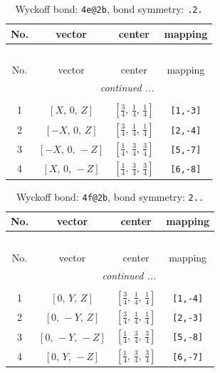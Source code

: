 \documentclass[fleqn,8pt]{jsarticle}
\begin{document}
\renewcommand{\arraystretch}{1.2}
\begin{longtable}{cccc}
\caption{Wyckoff bond: {\tt 4e@2b}, bond symmetry: {\tt .2.}}
 \\
 \hline \hline
No. & vector & center & mapping \\ \hline \endfirsthead

\multicolumn{3}{l}{\tablename\ \thetable{}} \\
 \hline \hline
No. & vector & center & mapping \\ \hline \endhead

 \hline \hline
\multicolumn{3}{r}{\footnotesize\it continued ...} \\ \endfoot

 \hline \hline
\multicolumn{3}{r}{} \\ \endlastfoot

1 & $\left[ X,\, 0,\, Z \right]$ & $\left[ \frac{3}{4},\, \frac{1}{4},\, \frac{1}{4} \right]$ & {\tt [1,-3]} \\ \hline
2 & $\left[ - X,\, 0,\, Z \right]$ & $\left[ \frac{3}{4},\, \frac{1}{4},\, \frac{1}{4} \right]$ & {\tt [2,-4]} \\ \hline
3 & $\left[ - X,\, 0,\, - Z \right]$ & $\left[ \frac{1}{4},\, \frac{3}{4},\, \frac{3}{4} \right]$ & {\tt [5,-7]} \\ \hline
4 & $\left[ X,\, 0,\, - Z \right]$ & $\left[ \frac{1}{4},\, \frac{3}{4},\, \frac{3}{4} \right]$ & {\tt [6,-8]} \\
\end{longtable}
\renewcommand{\arraystretch}{1.2}
\begin{longtable}{cccc}
\caption{Wyckoff bond: {\tt 4f@2b}, bond symmetry: {\tt 2..}}
 \\
 \hline \hline
No. & vector & center & mapping \\ \hline \endfirsthead

\multicolumn{3}{l}{\tablename\ \thetable{}} \\
 \hline \hline
No. & vector & center & mapping \\ \hline \endhead

 \hline \hline
\multicolumn{3}{r}{\footnotesize\it continued ...} \\ \endfoot

 \hline \hline
\multicolumn{3}{r}{} \\ \endlastfoot

1 & $\left[ 0,\, Y,\, Z \right]$ & $\left[ \frac{3}{4},\, \frac{1}{4},\, \frac{1}{4} \right]$ & {\tt [1,-4]} \\ \hline
2 & $\left[ 0,\, - Y,\, Z \right]$ & $\left[ \frac{3}{4},\, \frac{1}{4},\, \frac{1}{4} \right]$ & {\tt [2,-3]} \\ \hline
3 & $\left[ 0,\, - Y,\, - Z \right]$ & $\left[ \frac{1}{4},\, \frac{3}{4},\, \frac{3}{4} \right]$ & {\tt [5,-8]} \\ \hline
4 & $\left[ 0,\, Y,\, - Z \right]$ & $\left[ \frac{1}{4},\, \frac{3}{4},\, \frac{3}{4} \right]$ & {\tt [6,-7]} \\
\end{longtable}
\end{document}
